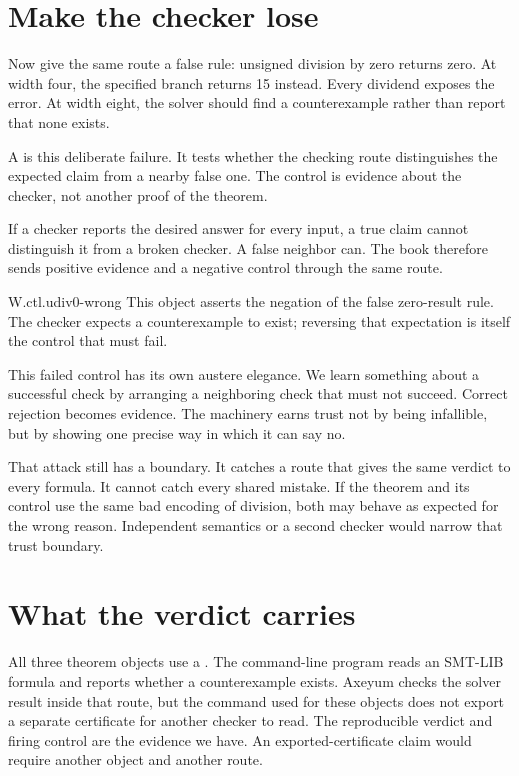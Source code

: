 \section{Make the checker lose}
\label{sec:negative-control}

Now give the same route a false rule: unsigned division by zero returns zero.
At width four, the specified branch returns 15 instead. Every dividend exposes
the error. At width eight, the solver should find a counterexample rather than
report that none exists.

A  is this deliberate failure. It tests whether the
checking route distinguishes the expected claim from a nearby false one. The
control is evidence about the checker, not another proof of the theorem.

\begin{keyidea}[title={A checker that cannot fail}]
If a checker reports the desired answer for every input, a true claim cannot
distinguish it from a broken checker. A false neighbor can. The book therefore
sends positive evidence and a negative control through the same route.
\end{keyidea}

\begin{artifact}{W.ctl.udiv0-wrong}
This object asserts the negation of the false zero-result rule. The checker
expects a counterexample to exist; reversing that expectation is itself the
control that must fail.
\end{artifact}

This failed control has its own austere elegance. We learn something about a
successful check by arranging a neighboring check that must not succeed.
Correct rejection becomes evidence. The machinery earns trust not by being
infallible, but by showing one precise way in which it can say no.

That attack still has a boundary. It catches a route that gives the same
verdict to every formula. It cannot catch every shared mistake. If the theorem
and its control use the same bad encoding of division, both may behave as
expected for the wrong reason. Independent semantics or a second checker
would narrow that trust boundary.

\section{What the verdict carries}
\label{sec:verdict}

All three theorem objects use a . The command-line
program reads an SMT-LIB formula and reports whether a counterexample exists.
Axeyum checks the solver result inside that route, but the command used for
these objects does not export a separate certificate for another checker to
read. The reproducible verdict and firing control are the evidence we have.
An exported-certificate claim would require another object and another route.

